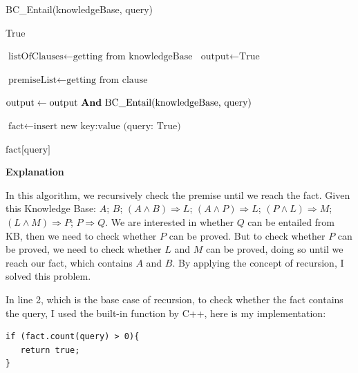 \documentclass{assignment}
\begin{document}
\begin{algorithm}
\caption{BC\_Entail(knowledgeBase, query)}
\begin{algorithmic}[1]
   
        \State \Return True
    \EndIf
    
    \State $\text{listOfClauses} \gets \text{getting from knowledgeBase}$
    \State $\text{output} \gets \text{True}$
    
   
            \State $\text{premiseList} \gets \text{getting from clause}$
            
                \State $\text{output} \gets \text{output \textbf{And} BC\_Entail(knowledgeBase, query)}$
                
                    \State $\text{fact} \gets \text{insert new key:value (query: True)}$
                \EndIf
            \EndFor
        \EndIf
    \EndFor
    
    \State \Return $\text{fact[query]}$
\EndFunction
\end{algorithmic}
\end{algorithm}

\textbf{Explanation}

In this algorithm, we recursively check the premise until we reach the fact. Given this Knowledge Base: $A$; $B$; $(A \land B) \Rightarrow L$; $(A \land P) \Rightarrow L$; $(P \land L) \Rightarrow M$; $(L \land M) \Rightarrow P$; $P \Rightarrow Q$. We are interested in whether $Q$ can be entailed from KB, then we need to check whether $P$ can be proved. But to check whether $P$ can be proved, we need to check whether $L$ and $M$ can be proved, doing so until we reach our fact, which contains $A$ and $B$. By applying the concept of recursion, I solved this problem. 

In line 2, which is the base case of recursion, to check whether the fact contains the query, I used the built-in function by C++, here is my implementation:

\lstset{language=C++}
\begin{lstlisting}[caption={Checking whether fact contains query}]
if (fact.count(query) > 0){
   return true;
}
\end{lstlisting}
\end{document}
